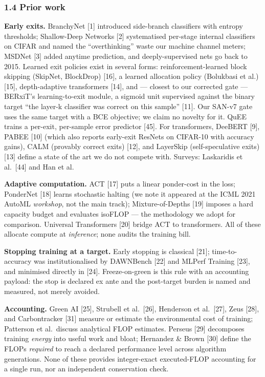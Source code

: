 \documentclass[
]{article}
\begin{document}
\hypertarget{prior-work}{%
\subsubsection{1.4 Prior work}\label{prior-work}}

\textbf{Early exits.} BranchyNet {[}1{]} introduced side-branch
classifiers with entropy thresholds; Shallow-Deep Networks {[}2{]}
systematised per-stage internal classifiers on CIFAR and named the
``overthinking'' waste our machine channel meters; MSDNet {[}3{]} added
anytime prediction, and deeply-supervised nets go back to 2015. Learned
exit policies exist in several forms: reinforcement-learned block
skipping (SkipNet, BlockDrop) {[}16{]}, a learned allocation policy
(Bolukbasi et al.) {[}15{]}, depth-adaptive transformers {[}14{]}, and
--- closest to our corrected gate --- BERxiT's learning-to-exit module,
a sigmoid unit supervised against the binary target ``the layer-k
classifier was correct on this sample'' {[}11{]}. Our SAN-v7 gate uses
the same target with a BCE objective; we claim no novelty for it. QuEE
trains a per-exit, per-sample error predictor {[}45{]}. For
transformers, DeeBERT {[}9{]}, PABEE {[}10{]} (which also reports
early-exit ResNets on CIFAR-10 with accuracy gains), CALM (provably
correct exits) {[}12{]}, and LayerSkip (self-speculative exits) {[}13{]}
define a state of the art we do not compete with. Surveys: Laskaridis et
al.~{[}44{]} and Han et al.

\textbf{Adaptive computation.} ACT {[}17{]} puts a linear ponder-cost in
the loss; PonderNet {[}18{]} learns stochastic halting (we note it
appeared at the ICML 2021 AutoML \emph{workshop}, not the main track);
Mixture-of-Depths {[}19{]} imposes a hard capacity budget and evaluates
isoFLOP --- the methodology we adopt for comparison. Universal
Transformers {[}20{]} bridge ACT to transformers. All of these allocate
compute at \emph{inference}; none audits the training bill.

\textbf{Stopping training at a target.} Early stopping is classical
{[}21{]}; time-to-accuracy was institutionalised by DAWNBench {[}22{]}
and MLPerf Training {[}23{]}, and minimised directly in {[}24{]}.
Freeze-on-green is this rule with an accounting payload: the stop is
declared ex ante and the post-target burden is named and measured, not
merely avoided.

\textbf{Accounting.} Green AI {[}25{]}, Strubell et al.~{[}26{]},
Henderson et al.~{[}27{]}, Zeus {[}28{]}, and Carbontracker {[}31{]}
measure or estimate the environmental cost of training; Patterson et
al.~discuss analytical FLOP estimates. Perseus {[}29{]} decomposes
training \emph{energy} into useful work and bloat; Hernandez \& Brown
{[}30{]} define the FLOPs \emph{required} to reach a declared
performance level across algorithm generations. None of these provides
integer-exact executed-FLOP accounting for a single run, nor an
independent conservation check.
\end{document}
